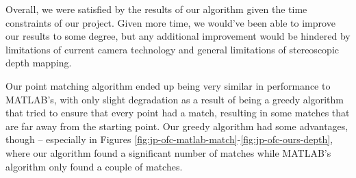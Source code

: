 Overall, we were satisfied by the results of our algorithm given the time constraints of our project. Given more time, we would've been able to improve our results to some degree, but any additional improvement would be hindered by limitations of current camera technology and general limitations of stereoscopic depth mapping. 

Our point matching algorithm ended up being very similar in performance to MATLAB's, with only slight degradation as a result of being a greedy algorithm that tried to ensure that every point had a match, resulting in some matches that are far away from the starting point. Our greedy algorithm had some advantages, though -- especially in Figures \ref{fig:jp-ofc-matlab-match}-\ref{fig:jp-ofc-ours-depth}, where our algorithm found a significant number of matches while MATLAB's algorithm only found a couple of matches. 

